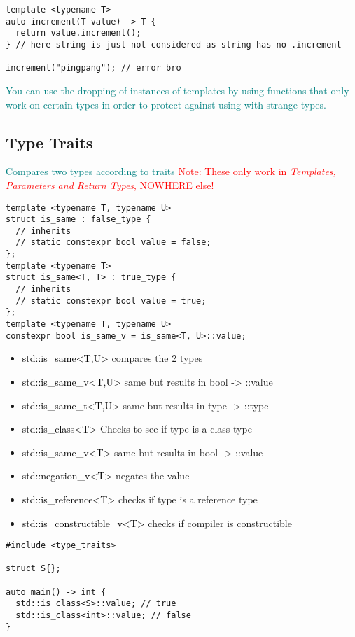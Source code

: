 \documentclass[main.tex,fontsize=8pt,paper=a4,paper=portrait,DIV=calc,]{scrartcl}
\begin{document}
\begin{lstlisting}
template <typename T>
auto increment(T value) -> T {
  return value.increment();
} // here string is just not considered as string has no .increment

increment("pingpang"); // error bro
\end{lstlisting}
\textcolor{teal}{You can use the dropping of instances of templates by using functions that only work on certain types in order to protect against using with strange types.}

\subsection{Type Traits}
\textcolor{teal}{Compares two types according to traits}\newline
\textcolor{red}{Note: These only work in \emph{Templates, Parameters and Return Types}, NOWHERE else!}
\begin{lstlisting}
template <typename T, typename U>
struct is_same : false_type {
  // inherits
  // static constexpr bool value = false;
};
template <typename T>
struct is_same<T, T> : true_type {
  // inherits
  // static constexpr bool value = true;
};
template <typename T, typename U>
constexpr bool is_same_v = is_same<T, U>::value;
\end{lstlisting}
\begin{itemize}
\item \textcolor{black}{std::is\_same<T,U>} compares the 2 types
\item \textcolor{black}{std::is\_same\_v<T,U>} same but results in bool -> ::value
\item \textcolor{black}{std::is\_same\_t<T,U>} same but results in type -> ::type
\item \textcolor{black}{std::is\_class<T>} Checks to see if type is a class type 
\item \textcolor{black}{std::is\_same\_v<T>} same but results in bool -> ::value 
\item \textcolor{black}{std::negation\_v<T>} negates the value 
\item \textcolor{black}{std::is\_reference<T>} checks if type is a reference type 
\item \textcolor{black}{std::is\_constructible\_v<T>} checks if compiler is constructible 
\end{itemize} 
\begin{lstlisting}
#include <type_traits>

struct S{};

auto main() -> int {
  std::is_class<S>::value; // true
  std::is_class<int>::value; // false
}
\end{lstlisting}
\end{document}
